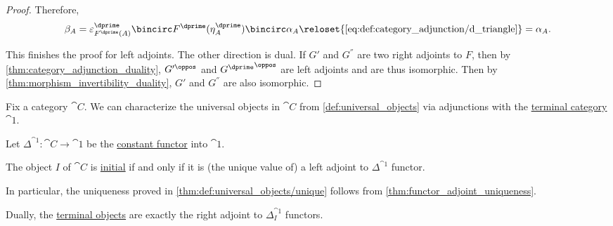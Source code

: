 \begin{proof}
  Therefore,
  \begin{equation*}
    \beta_A
    =
    \varepsilon^\dprime_{F^\dprime(A)} \bincirc F^\dprime(\eta^\dprime_A) \bincirc \alpha_A
    \reloset {\eqref{eq:def:category_adjunction/d_triangle}} =
    \alpha_A.
  \end{equation*}

  This finishes the proof for left adjoints. The other direction is dual. If \( G' \) and \( G^\dprime \) are two right adjoints to \( F \), then by \cref{thm:category_adjunction_duality}, \( G'^\oppos \) and \( {G^\dprime}^\oppos \) are left adjoints and are thus isomorphic. Then by \cref{thm:morphism_invertibility_duality}, \( G' \) and \( G^\dprime \) are also isomorphic.
\end{proof}

\begin{proposition}\label{thm:universal_objects_as_adjunctions}
  Fix a category \( \cat{C} \). We can characterize the universal objects in \( \cat{C} \) from \cref{def:universal_objects} via adjunctions with the \hyperref[def:singleton_category]{terminal category} \( \cat{1} \).

  Let \( \Delta^{\cat{1}}: \cat{C} \to \cat{1} \) be the \hyperref[def:diagonal_functor]{constant functor} into \( \cat{1} \).

  \begin{thmenum}
     The object \( I \) of \( \cat{C} \) is \hyperref[def:universal_objects]{initial} if and only if it is (the unique value of) a left adjoint to \( \Delta^{\cat{1}} \) functor.

    In particular, the uniqueness proved in \cref{thm:def:universal_objects/unique} follows from \cref{thm:functor_adjoint_uniqueness}.

     Dually, the \hyperref[def:universal_objects]{terminal objects} are exactly the right adjoint to \( \Delta_I^{\cat{1}} \) functors.
  \end{thmenum}
\end{proposition}
